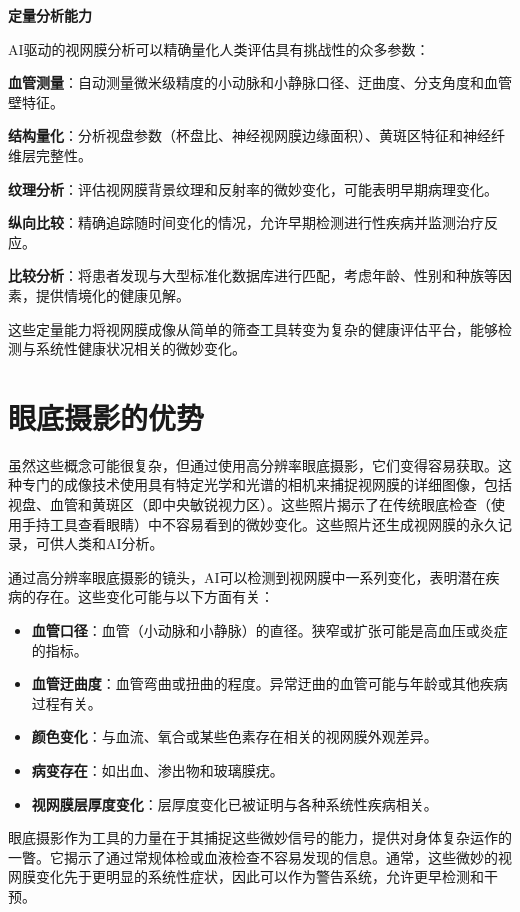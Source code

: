 \documentclass[
  Letterpaper,
]{scrbook}
\providecommand{\tightlist}{%
  \setlength{\itemsep}{0pt}\setlength{\parskip}{0pt}}\usepackage{longtable,booktabs,array}
\begin{document}
\textbf{定量分析能力}

AI驱动的视网膜分析可以精确量化人类评估具有挑战性的众多参数：

\textbf{血管测量}：自动测量微米级精度的小动脉和小静脉口径、迂曲度、分支角度和血管壁特征。

\textbf{结构量化}：分析视盘参数（杯盘比、神经视网膜边缘面积）、黄斑区特征和神经纤维层完整性。

\textbf{纹理分析}：评估视网膜背景纹理和反射率的微妙变化，可能表明早期病理变化。

\textbf{纵向比较}：精确追踪随时间变化的情况，允许早期检测进行性疾病并监测治疗反应。

\textbf{比较分析}：将患者发现与大型标准化数据库进行匹配，考虑年龄、性别和种族等因素，提供情境化的健康见解。

这些定量能力将视网膜成像从简单的筛查工具转变为复杂的健康评估平台，能够检测与系统性健康状况相关的微妙变化。

\section{眼底摄影的优势}\label{ux773cux5e95ux6444ux5f71ux7684ux4f18ux52bf}

虽然这些概念可能很复杂，但通过使用高分辨率眼底摄影，它们变得容易获取。这种专门的成像技术使用具有特定光学和光谱的相机来捕捉视网膜的详细图像，包括视盘、血管和黄斑区（即中央敏锐视力区）。这些照片揭示了在传统眼底检查（使用手持工具查看眼睛）中不容易看到的微妙变化。这些照片还生成视网膜的永久记录，可供人类和AI分析。

通过高分辨率眼底摄影的镜头，AI可以检测到视网膜中一系列变化，表明潜在疾病的存在。这些变化可能与以下方面有关：

\begin{itemize}
\tightlist
\item
  \textbf{血管口径}：血管（小动脉和小静脉）的直径。狭窄或扩张可能是高血压或炎症的指标。
\item
  \textbf{血管迂曲度}：血管弯曲或扭曲的程度。异常迂曲的血管可能与年龄或其他疾病过程有关。
\item
  \textbf{颜色变化}：与血流、氧合或某些色素存在相关的视网膜外观差异。
\item
  \textbf{病变存在}：如出血、渗出物和玻璃膜疣。
\item
  \textbf{视网膜层厚度变化}：层厚度变化已被证明与各种系统性疾病相关。
\end{itemize}

眼底摄影作为工具的力量在于其捕捉这些微妙信号的能力，提供对身体复杂运作的一瞥。它揭示了通过常规体检或血液检查不容易发现的信息。通常，这些微妙的视网膜变化先于更明显的系统性症状，因此可以作为警告系统，允许更早检测和干预。
\end{document}
